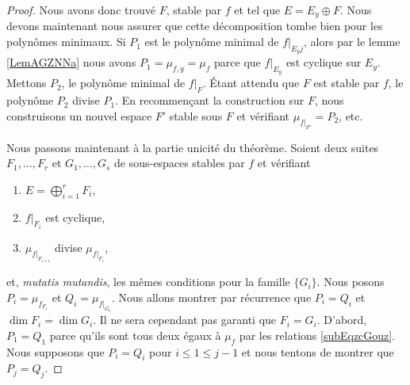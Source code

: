 \begin{proof}
    Nous avons donc trouvé \( F\), stable par \( f\) et tel que \( E=E_y\oplus F\). Nous devons maintenant nous assurer que cette décomposition tombe bien pour les polynômes minimaux. Si \( P_1\) est le polynôme minimal de \( f|_{E_yj}\), alors par le lemme \ref{LemAGZNNa} nous avons \( P_1=\mu_{f,y}=\mu_f\) parce que \( f|_{E_y}\) est cyclique sur \( E_y\). Mettons \( P_2\), le polynôme minimal de \( f|_F\). Étant attendu que \( F\) est stable par \( f\), le polynôme \( P_2\) divise \( P_1\). En recommençant la construction sur \( F\), nous construisons un nouvel espace \( F'\) stable sous \( F\) et vérifiant \( \mu_{f|_{F'}}=P_2\), etc.

    Nous passons maintenant à la partie unicité du théorème. Soient deux suites \( F_1,\ldots, F_r\) et \( G_1,\ldots, G_s\) de sous-espaces stables par \( f\) et vérifiant
    \begin{enumerate}
        \item
            \( E=\bigoplus_{i=1}^rF_i\),
        \item
            \( f|_{F_i}\) est cyclique,
        \item
            \( \mu_{f|_{F_{i+1}}}\) divise \( \mu_{f|_{F_i}}\),
    \end{enumerate}
    et, \emph{mutatis mutandis}, les mêmes conditions pour la famille \( \{ G_i \}\). Nous posons \( P_i=\mu_{f_{F_i}}\) et \( Q_i=\mu_{f|_{G_i}}\). Nous allons montrer par récurrence que \( P_i=Q_i\) et \( \dim F_i=\dim G_i\). Il ne sera cependant pas garanti que \( F_i=G_i\). D'abord, \( P_1=Q_1\) parce qu'ils sont tous deux égaux à \( \mu_f\) par les relations \eqref{subEqzcGouz}. Nous supposons que \( P_i=Q_i\) pour \( i\leq 1\leq j-1\) et nous tentons de montrer que \( P_j=Q_j\).


\end{proof}
